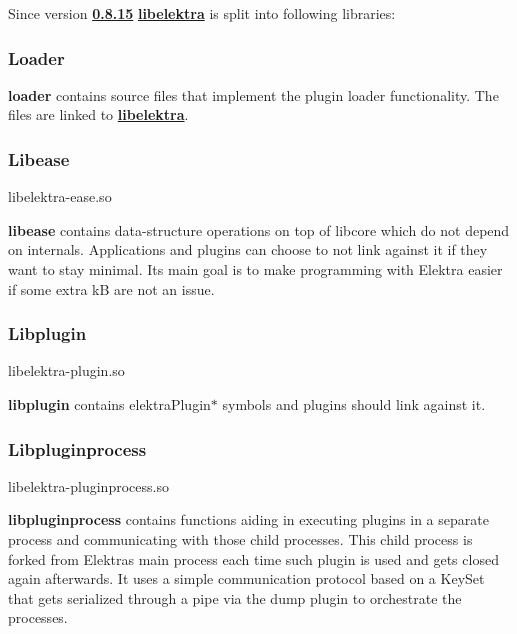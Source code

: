 Since version {\bfseries \hyperlink{doc_decisions_library_split_md}{0.8.15}} {\bfseries \hyperlink{md_src_libs_elektra_README_src_libs_elektra_README_md}{libelektra}} is split into following libraries\+:

 \subsubsection*{Loader}

{\bfseries loader} contains source files that implement the plugin loader functionality. The files are linked to {\bfseries \hyperlink{md_src_libs_elektra_README_src_libs_elektra_README_md}{libelektra}}.

\subsubsection*{Libease}

\begin{DoxyVerb}libelektra-ease.so
\end{DoxyVerb}


{\bfseries libease} contains data-\/structure operations on top of libcore which do not depend on internals. Applications and plugins can choose to not link against it if they want to stay minimal. Its main goal is to make programming with Elektra easier if some extra kB are not an issue.

\subsubsection*{Libplugin}

\begin{DoxyVerb}libelektra-plugin.so
\end{DoxyVerb}


{\bfseries libplugin} contains {\ttfamily elektra\+Plugin$\ast$} symbols and plugins should link against it.

\subsubsection*{Libpluginprocess}

\begin{DoxyVerb}libelektra-pluginprocess.so
\end{DoxyVerb}


{\bfseries libpluginprocess} contains functions aiding in executing plugins in a separate process and communicating with those child processes. This child process is forked from Elektra\textquotesingle{}s main process each time such plugin is used and gets closed again afterwards. It uses a simple communication protocol based on a Key\+Set that gets serialized through a pipe via the dump plugin to orchestrate the processes.

